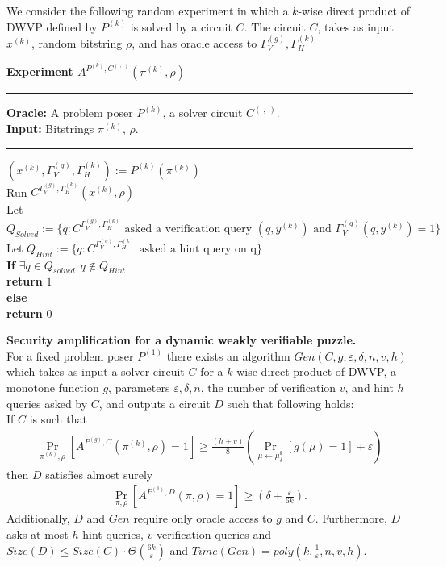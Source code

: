 %
We consider the following random experiment in which a $k$-wise direct product of DWVP defined by $P^{(k)}$ is solved by a circuit $C$.
The circuit $C$, takes as input $x^{(k)}$, random bitstring $\rho$, and has oracle access to $\Gamma^{(g)}_V, \Gamma^{(k)}_H$
%
\begin{codeblock}
  \textbf{Experiment $A^{P^{(k)}, C^{(\cdot, \cdot)}}(\pi^{(k)}, \rho)$}
  \medskip
  \hrule
  \medskip
  \textbf{Oracle:} A problem poser $P^{(k)}$, a solver circuit $C^{(\cdot,\cdot)}$.\\
  \textbf{Input:}  Bitstrings $\pi^{(k)}$, $\rho$.
  \medskip\hrule\medskip
  $(x^{(k)}, \Gamma_V^{(g)}, \Gamma_H^{(k)}) := P^{(k)}(\pi^{(k)})$ \\
  Run $C^{\Gamma_V^{(g)},\Gamma_H^{(k)}}(x^{(k)}, \rho)$ \\
  \IndI Let $Q_{Solved} := \{q: \text{$C^{\Gamma_V^{(g)}, \Gamma_H^{(k)}}$ asked a verification query $(q,y^{(k)})$ and $\Gamma_V^{(g)}(q, y^{(k)}) = 1$} \}$\\
  \IndI Let $Q_{Hint} := \{q: \text{$C^{\Gamma_V^{(g)}, \Gamma_H^{(k)}}$ asked a hint query on q} \}$\\
  \textbf{If} $\exists q \in Q_{solved} : q \notin Q_{Hint}$ \then \\
  \IndI \textbf{return} $1$\\
  \textbf{else} \\
  \IndI \textbf{return} $0$\\
\end{codeblock}
%
\begin{theorem}{\textbf{Security amplification for a dynamic weakly verifiable puzzle.}}
\label{th:sec_amp_for_dwvp}\\
For a fixed problem poser $P^{(1)}$ there exists an algorithm $Gen(C, g, \varepsilon, \delta, n, v, h)$ which takes as input a solver circuit $C$ for a $k$-wise
direct product of DWVP, a monotone function $g$, parameters $\varepsilon, \delta,n$, the number of verification $v$, and hint $h$ queries asked by $C$, and outputs a circuit $D$
such that following holds: \\
If $C$ is such that \\
  \begin{align*}
    \underset{\pi^{(k)}, \rho}{\Pr}[A^{P^{(g)}, C}(\pi^{(k)}, \rho) = 1]
    \geq \frac{(h+v)}{8} \left(\underset{\mu \leftarrow \mu_\delta^k}{\Pr}[g(\mu) = 1] + \varepsilon\right)
  \end{align*}
then $D$ satisfies almost surely
  \begin{align*}
    \underset{\pi, \rho}{\Pr}[A^{P^{(1)},D}(\pi, \rho) = 1] \geq (\delta + \frac{\varepsilon}{6k}).
  \end{align*}
Additionally, $D$ and $Gen$ require only oracle access to $g$ and $C$. Furthermore, $D$ asks at most $h$ hint queries, $v$ verification queries and
$Size(D) \leq Size(C) \cdot \Theta(\frac{6k}{\varepsilon})$ and $Time(Gen) = poly(k, \frac{1}{\varepsilon}, n, v, h)$.
\end{theorem}

